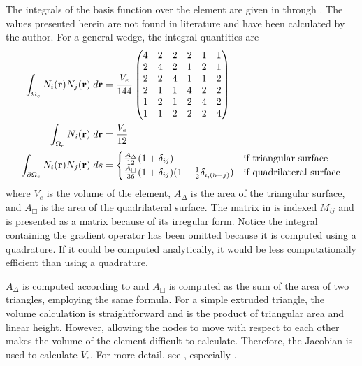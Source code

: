       The integrals of the basis function over the element are given in
       through . The values
      presented herein are not found in literature and have been calculated by
      the author. For a general wedge, the integral quantities are
      \begin{align}
        \label{eq:bigmat}
        \int_{\Omega_e} N_i(\mathbf{r}) N_j(\mathbf{r}) \;d\mathbf{r} &= 
          \frac{V_e}{144}
          \begin{pmatrix}
            4 & 2 & 2 & 2 & 1 & 1 \\
            2 & 4 & 2 & 1 & 2 & 1 \\
            2 & 2 & 4 & 1 & 1 & 2 \\
            2 & 1 & 1 & 4 & 2 & 2 \\
            1 & 2 & 1 & 2 & 4 & 2 \\
            1 & 1 & 2 & 2 & 2 & 4 
          \end{pmatrix} \\
        \int_{\Omega_e} N_i(\mathbf{r}) \;d\mathbf{r} &= \frac{V_e}{12} \\
        \label{eq:wedge_surface_integral}
        \int_{\partial \Omega_e} N_i(\mathbf{r}) 
          N_j(\mathbf{r}) \;ds &= 
          \begin{cases}
            \frac{A_{\Delta}}{12}(1+\delta_{ij})&\text{if triangular surface} \\
            \frac{A_{\Box}}{36}(1+\delta_{ij})(1-\frac{1}{2} \delta_{i,(5-j)}) &
              \text{if quadrilateral surface}
          \end{cases}
      \end{align}
      where $V_e$ is the volume of the element, $A_{\Delta}$ is the area of the
      triangular surface, and $A_{\Box}$ is the area of the quadrilateral
      surface. 
      The matrix in  is indexed $M_{ij}$
      and is presented as a matrix because of its irregular form. Notice the 
      integral containing the gradient operator has been omitted because it is
      computed using a quadrature. If it could be computed analytically, it 
      would be less computationally efficient than using a quadrature.
      
      $A_{\Delta}$ is computed according to  and
      $A_{\Box}$ is computed as the sum of the area of two triangles, employing
      the same formula.  For a simple extruded triangle, the volume calculation 
      is straightforward and is the product of triangular area and linear 
      height. However, allowing the nodes to move with respect to each other 
      makes the volume of the element difficult to calculate. Therefore, the 
      Jacobian is used to calculate $V_e$. For more detail, see 
      , especially .

